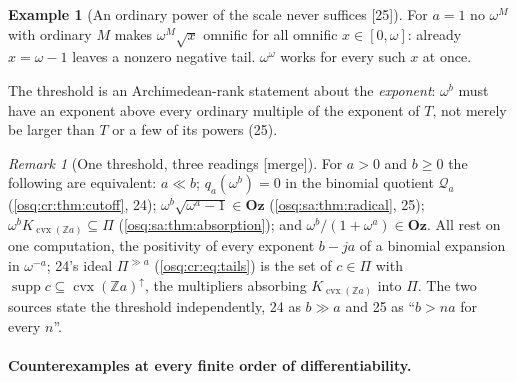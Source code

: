 \documentclass[11pt,letterpaper]{article}
\numberwithin{equation}{section}
\theoremstyle{definition}
\newtheorem{example}[example]{Example}
\theoremstyle{remark}
\newtheorem{remark}[remark]{Remark}
\theoremstyle{plain}
\newcommand{\Oz}{\mathbf{Oz}}
\newcommand{\Z}{\mathbb Z}
\newcommand{\Qa}{\mathcal Q}         %
\newcommand{\supp}{\operatorname{supp}}
\newcommand{\src}[1]{\textup{\textsf{[#1]}}}
\newcommand{\merge}{\textup{\textsf{[merge]}}}
\begin{document}
\begin{example}[An ordinary power of the scale never suffices \src{25}]\label{osq:sa:ex:finite}
For $a=1$ no $\omega^M$ with ordinary $M$ makes $\omega^M\sqrt x$ omnific for all omnific $x\in[0,\omega]$: already $x=\omega-1$ leaves a nonzero negative
tail. $\omega^\omega$ works for every such $x$ at once.
\end{example}

The threshold is an Archimedean-rank statement about the \emph{exponent}: $\omega^b$ must have an exponent above every ordinary multiple of the exponent of
$T$, not merely be larger than $T$ or a few of its powers (25).

\begin{remark}[One threshold, three readings \merge]\label{osq:sa:rem:threshold}
For $a>0$ and $b\ge0$ the following are equivalent: $a\ll b$; $q_a(\omega^b)=0$ in the binomial quotient $\Qa_a$ (\cref{osq:cr:thm:cutoff}, 24);
$\omega^b\sqrt{\omega^a-1}\in\Oz$ (\cref{osq:sa:thm:radical}, 25); $\omega^bK_{\operatorname{cvx}(\Z a)}\subseteq\Pi$ (\cref{osq:sa:thm:absorption}); and
$\omega^b/(1+\omega^a)\in\Oz$. All rest on one computation, the positivity of every exponent $b-ja$ of a binomial expansion in $\omega^{-a}$; 24's ideal
$\Pi^{\gg a}$ (\eqref{osq:cr:eq:tails}) is the set of $c\in\Pi$ with $\supp c\subseteq\operatorname{cvx}(\Z a)^{\uparrow}$, the multipliers absorbing
$K_{\operatorname{cvx}(\Z a)}$ into $\Pi$. The two sources state the threshold independently, 24 as $b\gg a$ and 25 as ``$b>na$ for every $n$''.
\end{remark}

\paragraph{Counterexamples at every finite order of differentiability.}
\end{document}
